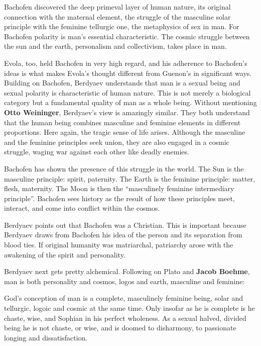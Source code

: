 \begin{quotex} 
Bachofen discovered the deep primeval layer of human nature, its original connection with the maternal element, the struggle of the masculine solar principle with the feminine tellurgic one, the metaphysics of sex in man. For Bachofen polarity is man's essential characteristic. The cosmic struggle between the sun and the earth, personalism and collectivism, takes place in man.
\end{quotex}


Evola, too, held Bachofen in very high regard, and his adherence to Bachofen's ideas is what makes Evola's thought different from Guenon's in significant ways. Building on Bachofen, Berdyaev understands that man is a sexual being and sexual polarity is characteristic of human nature. This is not merely a biological category but a fundamental quality of man as a whole being. Without mentioning \textbf{Otto Weininger}, Berdyaev's view is amazingly similar. They both understand that the human being combines masculine and feminine elements in different proportions. Here again, the tragic sense of life arises. Although the masculine and the feminine principles seek union, they are also engaged in a cosmic struggle, waging war against each other like deadly enemies.

Bachofen has shown the presence of this struggle in the world. The Sun is the masculine principle: spirit, paternity. The Earth is the feminine principle: matter, flesh, maternity. The Moon is then the ``masculinely feminine intermediary principle''. Bachofen sees history as the result of how these principles meet, interact, and come into conflict within the cosmos.

Berdyaev points out that Bachofen was a Christian. This is important because Berdyaev draws from Bachofen his idea of the person and its separation from blood ties. If original humanity was matriarchal, patriarchy arose with the awakening of the spirit and personality.

Berdyaev next gets pretty alchemical. Following on Plato and \textbf{Jacob Boehme}, man is both personality and cosmos, logos and earth, masculine and feminine:

\begin{quotex}
God's conception of man is a complete, masculinely feminine being, solar and tellurgic, logoic and cosmic at the same time. Only insofar as he is complete is he chaste, wise, and Sophian in his perfect wholeness. As a sexual halved, divided being he is not chaste, or wise, and is doomed to disharmony, to passionate longing and dissatisfaction.
\end{quotex}


